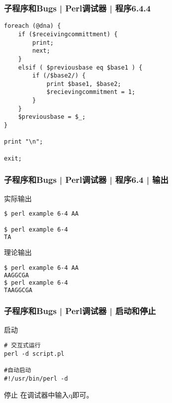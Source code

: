 \begin{frame}[fragile]
  \frametitle{子程序和Bugs | Perl调试器 | 程序6.4.4}
\begin{lstlisting}[firstnumber=40,basicstyle=\small\tt]
foreach (@dna) {
    if ($receivingcommittment) {
        print;
        next;
    }
    elsif ( $previousbase eq $base1 ) {
        if (/$base2/) {
            print $base1, $base2;
            $recievingcommitment = 1;
        }
    }
    $previousbase = $_;
}

print "\n";

exit;
\end{lstlisting}
\end{frame}

\begin{frame}[fragile]
  \frametitle{子程序和Bugs | Perl调试器 | 程序6.4 | 输出}
  \begin{block}{实际输出}
\begin{lstlisting}[language=sh]
$ perl example 6-4 AA

$ perl example 6-4
TA
\end{lstlisting}
  \end{block}
  \pause
  \begin{block}{理论输出}
\begin{lstlisting}[language=sh]
$ perl example 6-4 AA
AAGGCGA
$ perl example 6-4
TAAGGCGA
\end{lstlisting}
  \end{block}
\end{frame}

\begin{frame}[fragile]
  \frametitle{子程序和Bugs | Perl调试器 | \alert{启动和停止}}
  \begin{block}{启动}
\begin{lstlisting}
# 交互式运行
perl -d script.pl

#自动启动
#!/usr/bin/perl -d
\end{lstlisting}
  \end{block}
  \pause
  \begin{block}{停止}
    在调试器中输入q即可。
  \end{block}
\end{frame}

